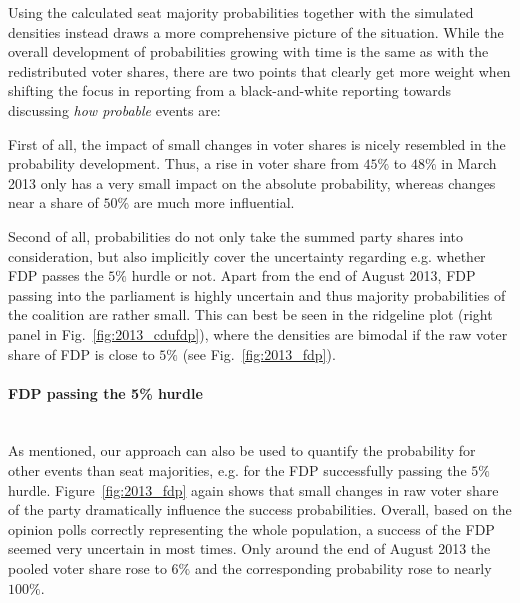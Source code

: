 \documentclass[smallcondensed]{svjour3}     %
\begin{document}
Using the calculated seat majority probabilities together with
the simulated densities instead draws a more comprehensive picture
of the situation. While the overall development of probabilities
growing with time is the same as with the redistributed voter shares,
there are two points that clearly get more weight when shifting 
the focus in reporting from a black-and-white reporting towards
discussing {\it how probable} events are:

First of all, the impact of small changes in voter shares is nicely resembled
in the probability development. Thus, a rise in voter share from $45\%$ to 
$48\%$ in March 2013 only has a very small impact on the absolute
probability, whereas changes near a share of $50\%$ are much more influential.

Second of all, probabilities do not only take the summed party
shares into consideration, but also implicitly cover the 
uncertainty regarding e.g. whether FDP passes the $5\%$ hurdle
or not. Apart from the end of August 2013, FDP passing into the
parliament is highly uncertain and thus majority probabilities of
the coalition are rather small. This can best be seen in the
ridgeline plot (right panel in Fig.~\ref{fig:2013_cdufdp}), where
the densities are bimodal if the raw voter share of FDP is close
to $5\%$ (see Fig.~\ref{fig:2013_fdp}).


\paragraph{FDP passing the 5\% hurdle} \ \\
As mentioned, our approach can also be used to quantify the probability
for other events than seat majorities, e.g. for the FDP successfully
passing the $5\%$ hurdle. Figure~\ref{fig:2013_fdp} again shows that
small changes in raw voter share of the party dramatically influence
the success probabilities. Overall, based on the opinion polls
correctly representing the whole population, a success of the FDP seemed
very uncertain in most times. Only around the end of August 2013
the pooled voter share rose to $6\%$ and the corresponding probability
rose to nearly $100\%$.
\end{document}
